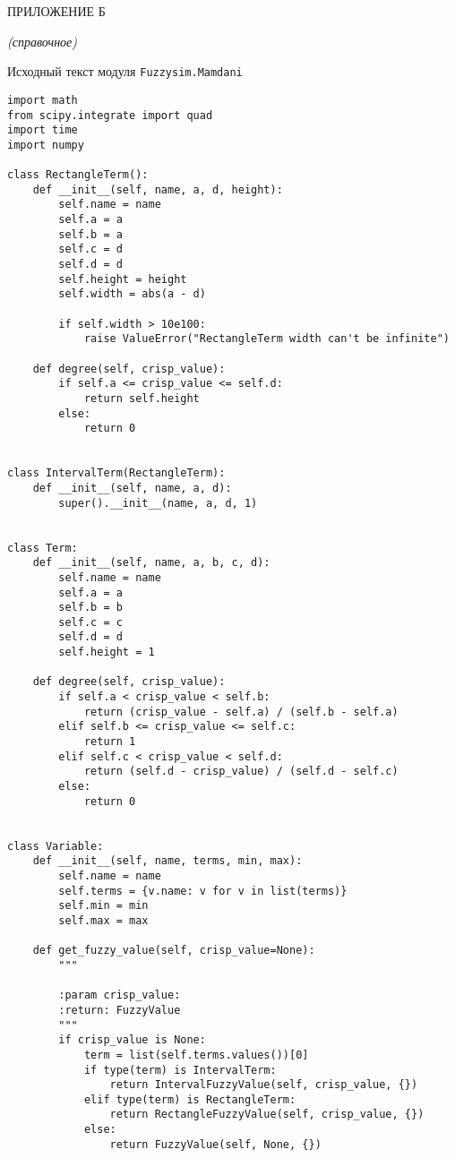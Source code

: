 \lstset{style=pythoninlinestyle}


 \begin{center}
	ПРИЛОЖЕНИЕ Б
	
	\textit{(справочное)}
\end{center}


\begin{center}
	Исходный текст модуля \lstinline!Fuzzysim.Mamdani!
\end{center}



\begin{lstlisting}[style=pythonstyle,caption={ }, label=lst:func:1]
import math
from scipy.integrate import quad
import time
import numpy

class RectangleTerm():
	def __init__(self, name, a, d, height):
		self.name = name
		self.a = a
		self.b = a
		self.c = d
		self.d = d
		self.height = height
		self.width = abs(a - d)

		if self.width > 10e100:
			raise ValueError("RectangleTerm width can't be infinite")

	def degree(self, crisp_value):
		if self.a <= crisp_value <= self.d:
			return self.height
		else:
			return 0


class IntervalTerm(RectangleTerm):
	def __init__(self, name, a, d):
		super().__init__(name, a, d, 1)


class Term:
	def __init__(self, name, a, b, c, d):
		self.name = name
		self.a = a
		self.b = b
		self.c = c
		self.d = d
		self.height = 1

	def degree(self, crisp_value):
		if self.a < crisp_value < self.b:
			return (crisp_value - self.a) / (self.b - self.a)
		elif self.b <= crisp_value <= self.c:
			return 1
		elif self.c < crisp_value < self.d:
			return (self.d - crisp_value) / (self.d - self.c)
		else:
			return 0


class Variable:
	def __init__(self, name, terms, min, max):
		self.name = name
		self.terms = {v.name: v for v in list(terms)}
		self.min = min
		self.max = max

	def get_fuzzy_value(self, crisp_value=None):
		"""

		:param crisp_value:
		:return: FuzzyValue
		"""
		if crisp_value is None:
			term = list(self.terms.values())[0]
			if type(term) is IntervalTerm:
				return IntervalFuzzyValue(self, crisp_value, {})
			elif type(term) is RectangleTerm:
				return RectangleFuzzyValue(self, crisp_value, {})
			else:
				return FuzzyValue(self, None, {})


\end{lstlisting}
